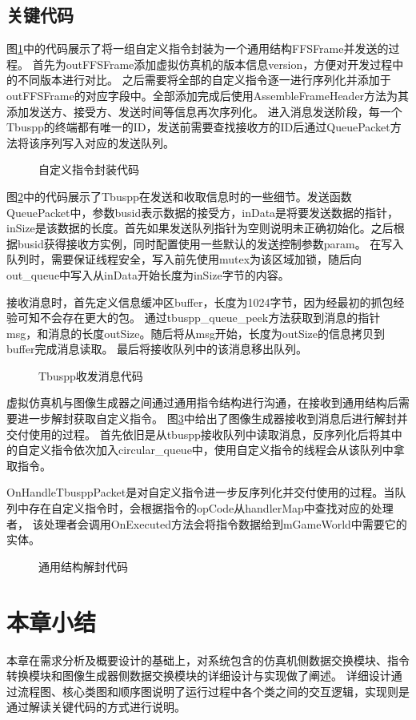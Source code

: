 \subsection{关键代码}
图\ref{IGsend}中的代码展示了将一组自定义指令封装为一个通用结构FFSFrame并发送的过程。
首先为outFFSFrame添加虚拟仿真机的版本信息version，方便对开发过程中的不同版本进行对比。
之后需要将全部的自定义指令逐一进行序列化并添加于outFFSFrame的对应字段中。全部添加完成后使用AssembleFrameHeader方法为其添加发送方、接受方、发送时间等信息再次序列化。
进入消息发送阶段，每一个Tbuspp的终端都有唯一的ID，发送前需要查找接收方的ID后通过QueuePacket方法将该序列写入对应的发送队列。
\begin{figure}[h!]
    \begin{center}
        
        \caption{自定义指令封装代码}
        \label{IGsend}
    \end{center}
\end{figure}
\par
图\ref{tbusio}中的代码展示了Tbuspp在发送和收取信息时的一些细节。发送函数QueuePacket中，参数busid表示数据的接受方，inData是将要发送数据的指针，
inSize是该数据的长度。首先如果发送队列指针为空则说明未正确初始化。之后根据busid获得接收方实例，同时配置使用一些默认的发送控制参数param。
在写入队列时，需要保证线程安全，写入前先使用mutex为该区域加锁，随后向out\_queue中写入从inData开始长度为inSize字节的内容。
\par
接收消息时，首先定义信息缓冲区buffer，长度为1024字节，因为经最初的抓包经验可知不会存在更大的包。
通过tbuspp\_queue\_peek方法获取到消息的指针msg，和消息的长度outSize。随后将从msg开始，长度为outSize的信息拷贝到buffer完成消息读取。
最后将接收队列中的该消息移出队列。
\begin{figure}[h!]
    \begin{center}
        
        \caption{Tbuspp收发消息代码}
        \label{tbusio}
    \end{center}
\end{figure}
\par
虚拟仿真机与图像生成器之间通过通用指令结构进行沟通，在接收到通用结构后需要进一步解封获取自定义指令。
图\ref{IGrecv}中给出了图像生成器接收到消息后进行解封并交付使用的过程。
首先依旧是从tbuspp接收队列中读取消息，反序列化后将其中的自定义指令依次加入circular\_queue中，使用自定义指令的线程会从该队列中拿取指令。
\par
OnHandleTbusppPacket是对自定义指令进一步反序列化并交付使用的过程。当队列中存在自定义指令时，会根据指令的opCode从handlerMap中查找对应的处理者，
该处理者会调用OnExecuted方法会将指令数据给到mGameWorld中需要它的实体。
\begin{figure}[h!]
    \begin{center}
        
        \caption{通用结构解封代码}
        \label{IGrecv}
    \end{center}
\end{figure}


\section{本章小结}
本章在需求分析及概要设计的基础上，对系统包含的仿真机侧数据交换模块、指令转换模块和图像生成器侧数据交换模块的详细设计与实现做了阐述。
详细设计通过流程图、核心类图和顺序图说明了运行过程中各个类之间的交互逻辑，实现则是通过解读关键代码的方式进行说明。
